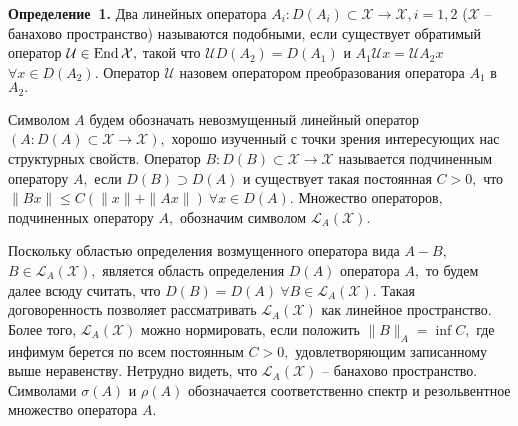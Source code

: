 \textbf{Определение~1.}
Два линейных оператора ${A_i \colon D(A_i) \subset \mathcal{X} \to \mathcal{X}, i = 1,2}$ ($\mathcal{X}$ -- банахово пространство) называются подобными, если существует обратимый оператор $\mathcal{U} \in \operatorname{End}\mathcal{X},$ такой что $\mathcal{U}D(A_2) = D(A_1)$ и $A_1\mathcal{U}x = \mathcal{U}A_2x$ $\forall x \in D(A_2).$ Оператор $\mathcal{U}$ назовем оператором преобразования оператора $A_1$ в $A_2.$

Символом $A$ будем обозначать невозмущенный линейный оператор \linebreak ${(A \colon D(A) \subset \mathcal{X} \to \mathcal{X}),}$ хорошо изученный с точки зрения интересующих нас структурных свойств. Оператор $B \colon D(B) \subset \mathcal{X} \to \mathcal{X}$ называется подчиненным оператору $A,$ если $D(B) \supset D(A)$ и существует такая постоянная $C > 0,$ что $\|Bx \| \leqslant C(\|x\| + \|Ax\|)~ \forall x \in D(A).$ Множество операторов, подчиненных оператору $A,$ обозначим символом $\mathcal{L}_A (\mathcal{X}).$

Поскольку областью определения возмущенного оператора вида ${A - B,}$ $B \in \mathcal{L}_A (\mathcal{X}),$ является область определения $D(A)$ оператора $A,$ то будем далее всюду считать, что $D(B) = D(A)~ \forall B \in \mathcal{L}_A (\mathcal{X}).$ Такая договоренность позволяет рассматривать $\mathcal{L}_A (\mathcal{X})$ как линейное пространство. Более того, $\mathcal{L}_A (\mathcal{X})$ можно нормировать, если положить $\| B\| _A = \inf C,$ где инфимум берется по всем постоянным $C > 0,$ удовлетворяющим записанному выше неравенству. Нетрудно видеть, что $\mathcal{L}_A (\mathcal{X})$ -- банахово пространство. Символами $\sigma (A)$ и $\rho (A)$ обозначается соответственно спектр и резольвентное множество оператора $A.$

